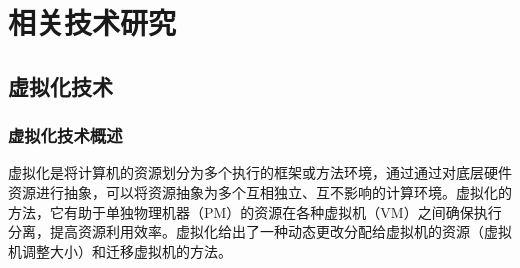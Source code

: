 \chapter{相关技术研究}

\section{虚拟化技术}

\subsection{虚拟化技术概述}
虚拟化是将计算机的资源划分为多个执行的框架或方法环境，通过通过对底层硬件资源进行抽象，可以将资源抽象为多个互相独立、互不影响的计算环境。虚拟化的方法，它有助于单独物理机器（PM）的资源在各种虚拟机（VM）之间确保执行分离，提高资源利用效率。虚拟化给出了一种动态更改分配给虚拟机的资源（虚拟机调整大小）和迁移虚拟机的方法\cite{Nivedita}。


